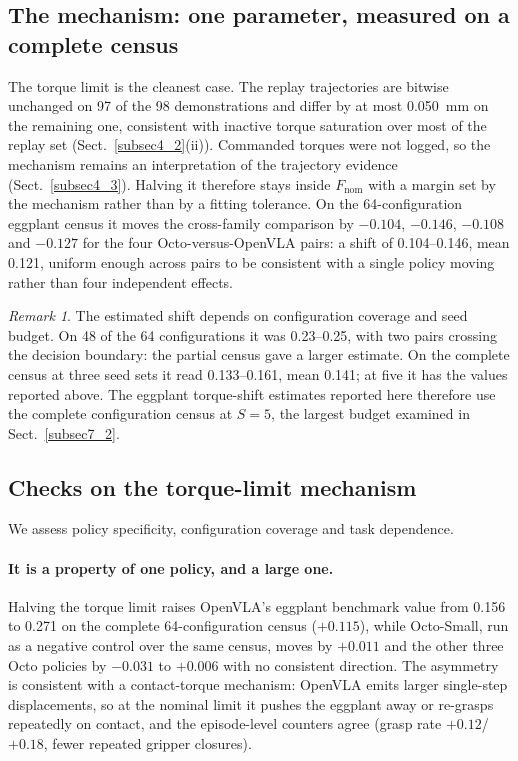 \documentclass[pdflatex,iicol,sn-apa]{sn-jnl}
\theoremstyle{remark}
\newtheorem{remark}{Remark}
\begin{document}
\subsection{The mechanism: one parameter, measured on a complete census}\label{subsec7_3}

The torque limit is the cleanest case. The replay trajectories are
bitwise unchanged on 97 of the 98 demonstrations and differ by at most 0.050~mm on the remaining
one, consistent with inactive torque saturation over most of the replay set
(Sect.~\ref{subsec4_2}(ii)). Commanded torques were not logged, so the mechanism remains an
interpretation of the trajectory evidence (Sect.~\ref{subsec4_3}). Halving it therefore stays inside
$F_{\mathrm{nom}}$ with a margin set by the mechanism rather than by a fitting tolerance. On the 64-configuration eggplant census it
moves the cross-family comparison by $-0.104$, $-0.146$, $-0.108$ and $-0.127$ for the four
Octo-versus-OpenVLA pairs: a shift of 0.104--0.146, mean 0.121, uniform enough across pairs
to be consistent with a single policy moving rather than four independent effects.

\begin{remark}
The estimated shift depends on configuration coverage and seed budget. On 48 of the 64
configurations it was 0.23--0.25, with two pairs crossing the decision
boundary: the partial census gave a larger estimate. On the complete census at three seed sets it read
0.133--0.161, mean 0.141; at five it has the values reported above. The eggplant torque-shift estimates reported here therefore use the complete configuration
census at $S = 5$, the largest budget examined in Sect.~\ref{subsec7_2}.
\end{remark}

\subsection{Checks on the torque-limit mechanism}\label{subsec7_4}

We assess policy specificity, configuration coverage and task dependence.

\paragraph{It is a property of one policy, and a large one.}
Halving the torque limit raises OpenVLA's eggplant benchmark value from 0.156 to 0.271 on the
complete 64-configuration census ($+0.115$), while Octo-Small, run as a negative control over the
same census, moves by $+0.011$ and the other three Octo policies by $-0.031$ to $+0.006$ with no
consistent direction. The asymmetry is consistent with a contact-torque mechanism: OpenVLA emits larger single-step displacements,
so at the nominal limit it pushes the eggplant away or re-grasps repeatedly on contact, and the
episode-level counters agree (grasp rate $+0.12$/$+0.18$, fewer repeated gripper closures).
\end{document}
